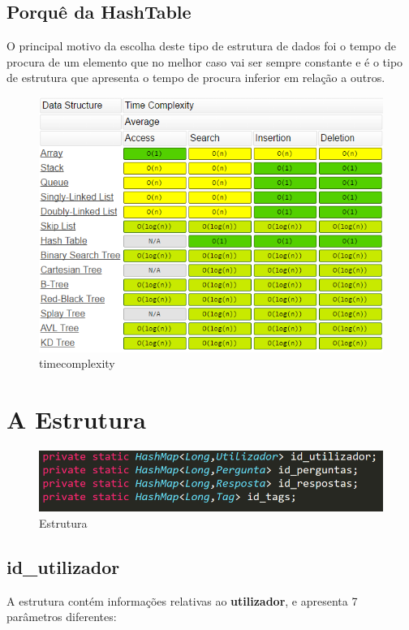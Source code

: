 \documentclass[a4paper]{article}
\begin{document}
	\subsection{Porquê da HashTable}

O principal motivo da escolha deste tipo de estrutura de dados foi o tempo de procura de um elemento que no melhor caso vai ser sempre constante e é o tipo de estrutura que apresenta o tempo de procura inferior em relação a outros.

 
\begin{figure}[ht]
\centering
\includegraphics[scale =0.25]{timecomplexity.jpeg}
\caption{timecomplexity}
\label{img:time_complexity}
\end{figure}

\pagebreak

\section{A Estrutura}

\begin{figure}[H]
\centering
\includegraphics[scale =0.25]{tcd.png}
\caption{Estrutura}
\label{img:tcd}
\end{figure}

	\subsection{id_utilizador}
	A estrutura contém informações relativas ao \textbf{utilizador}, e apresenta 7 parâmetros diferentes:
\end{document}
